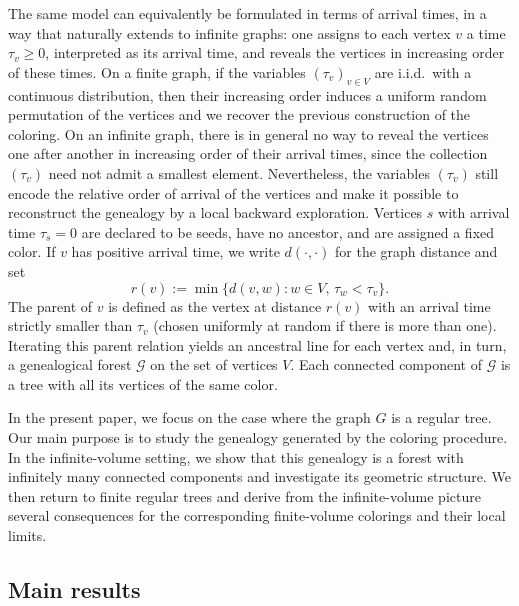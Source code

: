 \documentclass[french]{article}
\renewcommand{\1}{\mathds{1}}
\begin{document}
\medskip

The same model can equivalently be formulated in terms of arrival times, in a way that naturally extends to infinite graphs: one assigns to each vertex $v$ a time $\tau_v \geq 0$, interpreted as its arrival time, and reveals the vertices in increasing order of these times. On a finite graph, if the variables $(\tau_v)_{v\in V}$ are i.i.d.\ with a continuous distribution, then their increasing order induces a uniform random permutation of the vertices and we recover the previous construction of the coloring. On an infinite graph, there is in general no way to reveal the vertices one after another in increasing order of their arrival times, since the collection $(\tau_v)$ need not admit a smallest element. Nevertheless, the variables $(\tau_v)$ still encode the relative order of arrival of the vertices and make it possible to reconstruct the genealogy by a local backward exploration. Vertices $s$ with arrival time $\tau_s = 0$ are declared to be seeds, have no ancestor, and are assigned a fixed color. If $v$ has positive arrival time, we write $d(\cdot,\cdot)$ for the graph distance and set
\begin{equation}\label{eq:radius}
r(v):=\min\bigl\{d(v,w): w\in V,\, \tau_w<\tau_v\bigr\}.
\end{equation}
The parent of $v$ is defined as the vertex at distance $r(v)$ with an arrival time strictly smaller than $\tau_v$ (chosen uniformly at random if there is more than one). Iterating this parent relation yields an ancestral line for each vertex and, in turn, a genealogical forest $\mathcal{G}$ on the set of vertices $V$. Each connected component of $\mathcal{G}$ is a tree with all its vertices of the same color.

\medskip


In the present paper, we focus on the case where the graph $G$ is a regular tree. Our main purpose is to study the genealogy generated by the coloring procedure. In the infinite-volume setting, we show that this genealogy is a forest with infinitely many connected components and investigate its geometric structure. We then return to finite regular trees and derive from the infinite-volume picture several consequences for the corresponding finite-volume colorings and their local limits.




\subsection{Main results}
\end{document}
